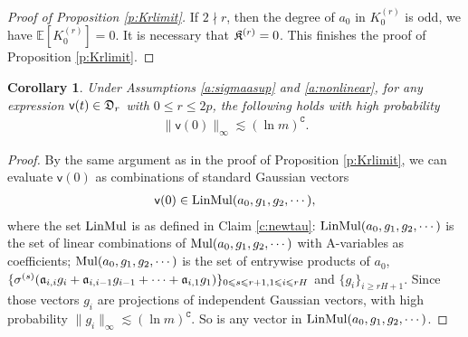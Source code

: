 \documentclass{article}
\numberwithin{equation}{section}
\newcommand{\fC}{{\mathtt C}}
\newcommand{\fa}{{\frak a}}
\newcommand{\fD}{{\frak D}}
\newcommand{\fK}{{\frak K}}
\newcommand{\sfv}{{\mathsf v}}
\newcommand{\bE}{\mathbb{E}}
\renewcommand{\leq}{\leqslant}
\renewcommand{\geq}{\geqslant}
\newcommand{\1}{\mathds{1}}
\theoremstyle{plain} %
\newtheorem{corollary}[theorem]{Corollary}
\newcommand{\LinMul}{{\rm LinMul}}
\newcommand{\Mul}{{\rm Mul}}
\begin{document}
\begin{proof}[Proof of Proposition \ref{p:Krlimit}]

If $2\nmid r$, then the degree of $a_0$ in $K_0^{(r)}$ is odd, we have $\bE[K_0^{(r)}]=0$. It is necessary that $\fK^{(r)}=0$. This finishes the proof of Proposition \ref{p:Krlimit}.

\end{proof}


\begin{corollary}\label{c:f0bound}
Under Assumptions \ref{a:sigmaasup} and \ref{a:nonlinear}, for any expression $\sfv(t)\in \fD_r$ with $0\leq r\leq 2p$, the following holds with high probability
%
\begin{align*}
\|\sfv(0)\|_\infty\lesssim (\ln m)^\fC.
\end{align*}
\end{corollary}
\begin{proof}
By the same argument as in the proof of Proposition \ref{p:Krlimit}, we can evaluate $\sfv(0)$ as combinations of standard Gaussian vectors 
\begin{align*}
\sfv(0)\in\LinMul(a_0, g_1,g_2,\cdots),
\end{align*}
where the set $\LinMul$ is as defined in Claim \ref{c:newtau}:
$\LinMul(a_0, g_1,g_2,\cdots)$
is the set of linear combinations of $\Mul(a_0, g_1,g_2,\cdots)$ with A-variables as coefficients;
$\Mul(a_0, g_1,g_2,\cdots)$ is the set of entrywise products of 
$a_0$, $\{\sigma^{(s)}(\fa_{i,i}g_i+\fa_{i,i-1}g_{i-1}+\cdots+\fa_{i,1}g_1)\}_{0\leq s\leq r+1, 1\leq i\leq rH}$ and $\{g_i\}_{i\geq rH+1}$. Since those vectors $g_i$ are projections of independent Gaussian vectors, with high probability $\|g_i\|_\infty\lesssim (\ln m)^{\fC}$. So is any vector in $\LinMul(a_0, g_1,g_2,\cdots)$. 


 
\end{proof}
\end{document}
